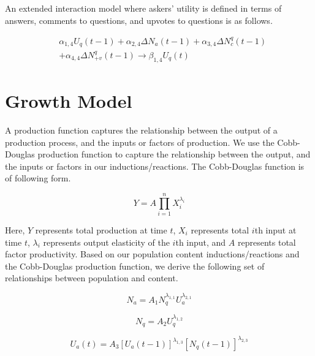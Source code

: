 \documentclass{sig-alternate-10pt}
\begin{document}
\noindent An extended interaction model where askers' utility is defined in terms of answers, comments to questions, and upvotes to questions is as follows.

    \begin{equation*}
    \begin{split}
    & \alpha_{1, 4} U_q(t-1) + \alpha_{2, 4} \Delta N_a(t-1) + \alpha_{3, 4} \Delta N_c^q(t-1)\\
    & + \alpha_{4, 4} \Delta N_{+v}^q(t-1) \rightarrow \beta_{1, 4} U_q(t) 
    \end{split}
    \end{equation*}

\section{Growth Model}
A production function captures the relationship between the output of a production process, and the inputs or factors of production. We use the Cobb-Douglas production function to capture the relationship between the output, and the inputs or factors in our inductions/reactions. The Cobb-Douglas function is of following form.

    \begin{equation*}
    Y = A\prod_{i=1}^{n} X_i^{\lambda_i}
    \end{equation*}
    
\noindent Here, $Y$ represents total production at time $t$, $X_i$ represents total $i$th input at time $t$, $\lambda_i$ represents output elasticity of the $i$th input, and $A$ represents total factor productivity.
\newline
\newline
Based on our population content inductions/reactions and the Cobb-Douglas production function, we derive the following set of relationships between population and content. 

    \begin{equation}
    N_a = A_1 N_q^{\lambda_{1, 1}} U_a^{\lambda_{2, 1}}
    \end{equation}
    
    \begin{equation}
    N_q = A_2 U_q^{\lambda_{1, 2}}
    \end{equation}
    
    \begin{equation}
    U_a(t) = A_3 [U_a(t-1)]^{\lambda_{1, 3}} [N_q(t-1)]^{\lambda_{2, 3}}
    \end{equation}
    
\end{document}
